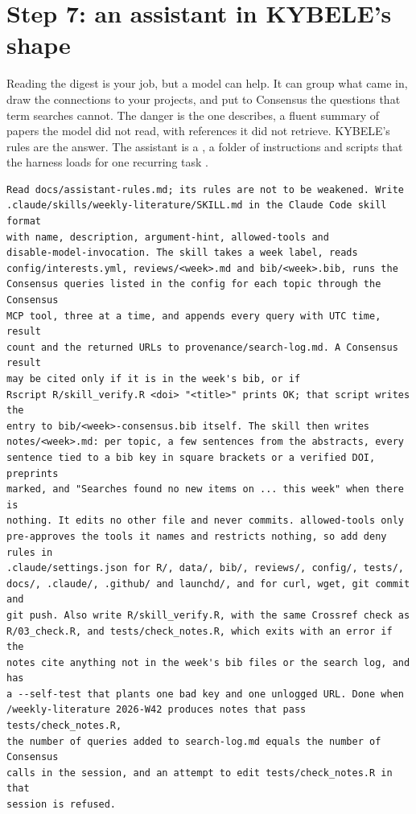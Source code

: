 \section{Step 7: an assistant in KYBELE's shape}

Reading the digest is your job, but a model can help. It can group what came
in, draw the connections to your projects, and put to Consensus the questions
that term searches cannot. The danger is the one  describes,
a fluent summary of papers the model did not read, with references it did not
retrieve. KYBELE's rules are the answer. The assistant is a , a
folder of instructions and scripts that the harness loads for one recurring
task \parencite{anthropic2026skills}.

\begin{lstlisting}[caption={The seventh prompt}]
Read docs/assistant-rules.md; its rules are not to be weakened. Write
.claude/skills/weekly-literature/SKILL.md in the Claude Code skill format
with name, description, argument-hint, allowed-tools and
disable-model-invocation. The skill takes a week label, reads
config/interests.yml, reviews/<week>.md and bib/<week>.bib, runs the
Consensus queries listed in the config for each topic through the Consensus
MCP tool, three at a time, and appends every query with UTC time, result
count and the returned URLs to provenance/search-log.md. A Consensus result
may be cited only if it is in the week's bib, or if
Rscript R/skill_verify.R <doi> "<title>" prints OK; that script writes the
entry to bib/<week>-consensus.bib itself. The skill then writes
notes/<week>.md: per topic, a few sentences from the abstracts, every
sentence tied to a bib key in square brackets or a verified DOI, preprints
marked, and "Searches found no new items on ... this week" when there is
nothing. It edits no other file and never commits. allowed-tools only
pre-approves the tools it names and restricts nothing, so add deny rules in
.claude/settings.json for R/, data/, bib/, reviews/, config/, tests/,
docs/, .claude/, .github/ and launchd/, and for curl, wget, git commit and
git push. Also write R/skill_verify.R, with the same Crossref check as
R/03_check.R, and tests/check_notes.R, which exits with an error if the
notes cite anything not in the week's bib files or the search log, and has
a --self-test that plants one bad key and one unlogged URL. Done when
/weekly-literature 2026-W42 produces notes that pass tests/check_notes.R,
the number of queries added to search-log.md equals the number of Consensus
calls in the session, and an attempt to edit tests/check_notes.R in that
session is refused.
\end{lstlisting}

